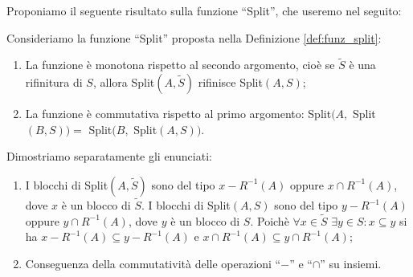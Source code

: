 Proponiamo il seguente risultato sulla funzione ``Split'', che useremo nel seguito:
\begin{theorem}
    \label{theo:split_properties}
    Consideriamo la funzione ``Split'' proposta nella Definizione \ref{def:funz_split}:
    \begin{enumerate}
        \item La funzione è monotona rispetto al secondo argomento, cioè se $\widetilde{S}$ è una rifinitura di $S$, allora Split$(A,\widetilde{S})$ rifinisce Split$(A,S)$;
        \item La funzione è commutativa rispetto al primo argomento: Split$(A,$ Split$(B,S)) =$ Split$(B,$ Split$(A,S))$.
    \end{enumerate}
\end{theorem}
\begin{proof2}
    Dimostriamo separatamente gli enunciati:
    \begin{enumerate}
        \item I blocchi di Split$(A,\widetilde{S})$ sono del tipo $x - R^{-1}(A)$ oppure $x \cap R^{-1}(A)$, dove $x$ è un blocco di $\widetilde{S}$. I blocchi di Split$(A,S)$ sono del tipo $y - R^{-1}(A)$ oppure $y \cap R^{-1}(A)$, dove $y$ è un blocco di $S$. Poichè $\forall x \in \widetilde{S} \,\,\exists y \in S : x \subseteq y$ si ha $x - R^{-1}(A) \subseteq y - R^{-1}(A)$ e $x \cap R^{-1}(A) \subseteq y \cap R^{-1}(A)$;
        \item Conseguenza della commutatività delle operazioni ``$-$'' e ``$\cap$'' su insiemi.
    \end{enumerate}
\end{proof2}

